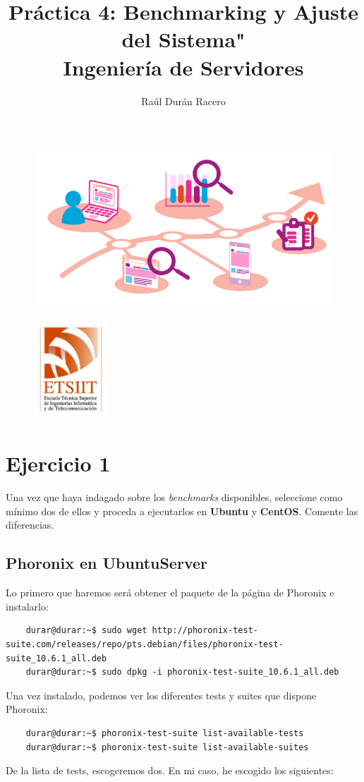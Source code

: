 \documentclass[a4paper]{article}
\begin{document}
\pagestyle{plain}
\title{Práctica 4: Benchmarking y Ajuste del Sistema" \\ 
Ingeniería de Servidores}
\author{Raúl Durán Racero}
\begin{figure}
    \raggedright
    \includegraphics[width=1.25\textwidth]{benchmarking004.png}
\end{figure}
\maketitle
\begin{figure}
    \centering
    \includegraphics[width=0.25\textwidth]{logoEtsiit.pdf}
\end{figure}

\newpage
\tableofcontents
\newpage
\section{Ejercicio 1}
Una vez que haya indagado sobre los \textsl{benchmarks} disponibles, seleccione 
como mínimo dos de ellos y proceda a ejecutarlos en \textbf{Ubuntu} y \textbf{CentOS}.
Comente las diferencias.
\subsection{Phoronix en UbuntuServer}
Lo primero que haremos será obtener el paquete de la página de Phoronix e instalarlo:
\begin{lstlisting}
    durar@durar:~$ sudo wget http://phoronix-test-suite.com/releases/repo/pts.debian/files/phoronix-test-suite_10.6.1_all.deb
    durar@durar:~$ sudo dpkg -i phoronix-test-suite_10.6.1_all.deb
\end{lstlisting}
Una vez instalado, podemos ver los diferentes tests y suites que dispone Phoronix:
\begin{lstlisting}
    durar@durar:~$ phoronix-test-suite list-available-tests
    durar@durar:~$ phoronix-test-suite list-available-suites
\end{lstlisting}
De la lista de tests, escogeremos dos. En mi caso, he escogido los siguientes:
\end{document}
